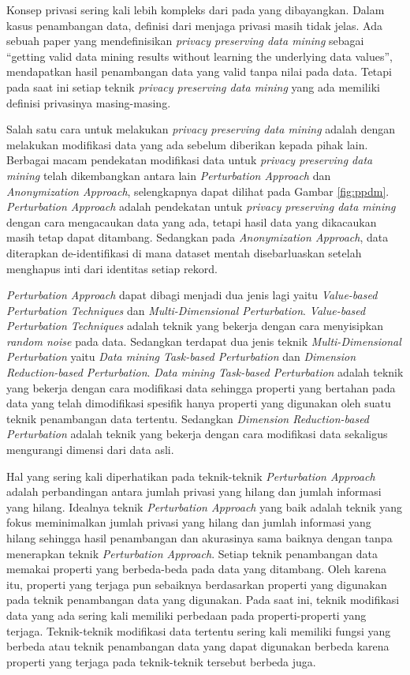 \documentclass[a4paper,twoside]{article}
\begin{document}
\begin{enumerate}
		Konsep privasi sering kali lebih kompleks dari pada yang dibayangkan. Dalam kasus penambangan data, definisi dari menjaga privasi masih tidak jelas. Ada sebuah paper yang mendefinisikan \textit{privacy preserving data mining} sebagai “getting valid data mining results without learning the underlying data values”, mendapatkan hasil penambangan data yang valid tanpa  nilai pada data. Tetapi pada saat ini setiap teknik \textit{privacy preserving data mining} yang ada memiliki definisi privasinya masing-masing. 
		
		Salah satu cara untuk melakukan \textit{privacy preserving data mining} adalah dengan melakukan modifikasi data yang ada sebelum diberikan kepada pihak lain. Berbagai macam pendekatan modifikasi data untuk \textit{privacy preserving data mining} telah dikembangkan antara lain \textit{Perturbation Approach} dan \textit{Anonymization Approach}, selengkapnya dapat dilihat pada Gambar \ref{fig:ppdm}. \textit{Perturbation Approach} adalah pendekatan untuk \textit{privacy preserving data mining} dengan cara mengacaukan data yang ada, tetapi hasil data yang dikacaukan masih tetap dapat ditambang. Sedangkan pada \textit{Anonymization Approach}, data diterapkan de-identifikasi di mana dataset mentah disebarluaskan setelah menghapus inti dari identitas setiap rekord.
		
		\textit{Perturbation Approach} dapat dibagi menjadi dua jenis lagi yaitu \textit{Value-based Perturbation Techniques} dan \textit{Multi-Dimensional Perturbation}. \textit{Value-based Perturbation Techniques} adalah teknik yang bekerja dengan cara menyisipkan \textit{random noise} pada data. Sedangkan terdapat dua jenis teknik \textit{Multi-Dimensional Perturbation} yaitu \textit{Data mining Task-based Perturbation} dan \textit{Dimension Reduction-based Perturbation}. \textit{Data mining Task-based Perturbation} adalah teknik yang bekerja dengan cara modifikasi data sehingga properti yang bertahan pada data yang telah dimodifikasi spesifik hanya properti yang digunakan oleh suatu teknik penambangan data tertentu. Sedangkan \textit{Dimension Reduction-based Perturbation} adalah teknik yang bekerja dengan cara modifikasi data sekaligus mengurangi dimensi dari data asli.
		
		Hal yang sering kali diperhatikan pada teknik-teknik \textit{Perturbation Approach} adalah perbandingan antara jumlah privasi yang hilang dan jumlah informasi yang hilang. Idealnya teknik \textit{Perturbation Approach} yang baik adalah teknik yang fokus meminimalkan jumlah privasi yang hilang dan jumlah informasi yang hilang sehingga hasil penambangan dan akurasinya sama baiknya dengan tanpa menerapkan teknik \textit{Perturbation Approach}. Setiap teknik penambangan data memakai properti yang berbeda-beda pada data yang ditambang. Oleh karena itu, properti yang terjaga pun sebaiknya berdasarkan properti yang digunakan pada teknik penambangan data yang digunakan. Pada saat ini, teknik modifikasi data yang ada sering kali memiliki perbedaan pada properti-properti yang terjaga. Teknik-teknik modifikasi data tertentu sering kali memiliki fungsi yang berbeda atau teknik penambangan data yang dapat digunakan berbeda karena properti yang terjaga pada teknik-teknik tersebut berbeda juga.


\end{enumerate}
\end{document}
